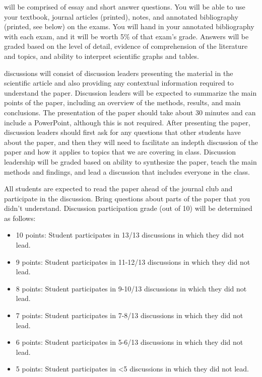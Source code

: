 \documentclass{tufte-handout}
\begin{document}
\begin{fullwidth}




 will be comprised of essay and short answer questions. You will be able to use your textbook, journal articles (printed), notes, and annotated bibliography (printed, see below) on the exams. You will hand in your annotated bibliography with each exam, and it will be worth 5\% of that exam's grade. Answers will be graded based on the level of detail, evidence of comprehension of the literature and topics, and ability to interpret scientific graphs and tables. 

 discussions will consist of discussion leaders presenting the material in the scientific article and also providing any contextual information required to understand the paper. Discussion leaders will be expected to summarize the main points of the paper, including an overview of the methods, results, and main conclusions. The presentation of the paper should take about 30 minutes and can include a PowerPoint, although this is not required. After presenting the paper, discussion leaders should first ask for any questions that other students have about the paper, and then they will need to facilitate an indepth discussion of the paper and how it applies to topics that we are covering in class. Discussion leadership will be graded based on ability to synthesize the paper, teach the main methods and findings, and lead a discussion that includes everyone in the class. 

All students are expected to read the paper ahead of the journal club and participate in the discussion. Bring questions about parts of the paper that you didn't understand. Discussion participation grade (out of 10) will be determined as follows:

\begin{itemize}
\item 10 points: Student participates in 13/13 discussions in which they did not lead. 
\item 9 points: Student participates in 11-12/13 discussions in which they did not lead. 
\item 8 points: Student participates in 9-10/13 discussions in which they did not lead.
\item 7 points: Student participates in 7-8/13 discussions in which they did not lead.
\item 6 points: Student participates in 5-6/13 discussions in which they did not lead.
\item 5 points: Student participates in <5 discussions in which they did not lead.
\end{itemize}


\end{fullwidth}
\end{document}
